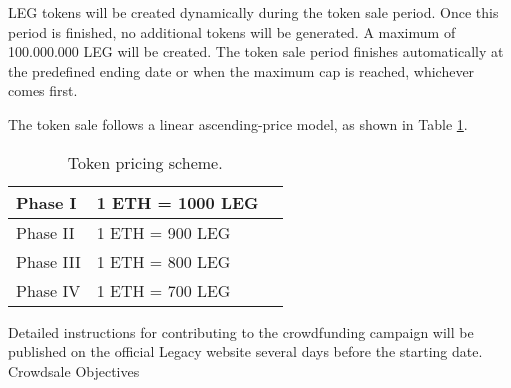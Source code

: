 LEG tokens will be created dynamically during the token sale period. Once this period is finished, no additional tokens will be generated. A maximum of 100.000.000 LEG will be created. The token sale period finishes automatically at the predefined ending date or when the maximum cap is reached, whichever comes first.

The token sale follows a linear ascending-price model, as shown in Table \ref{table:ico_token_price}.

\begin{table}[h]
	\begin{center}
		{\renewcommand{\arraystretch}{1.3}	
			\small
			\begin{tabular}{| l | p{5cm} | p{3cm}  |}	
		    	\hline			    
		    	Phase I		&  1 ETH = 1000 LEG \\ \hline
		    	Phase II	&  1 ETH = 900 LEG  \\ \hline
		    	Phase III	&  1 ETH = 800 LEG  \\ \hline
		    	Phase IV	&  1 ETH = 700 LEG  \\ \hline	
			\end{tabular}				
		}
	\caption{Token pricing scheme.}
	\label{table:ico_token_price}		
	\end{center}
\end{table}

Detailed instructions for contributing to the crowdfunding campaign will be published on the official Legacy website several days before the starting date.  
Crowdsale Objectives




